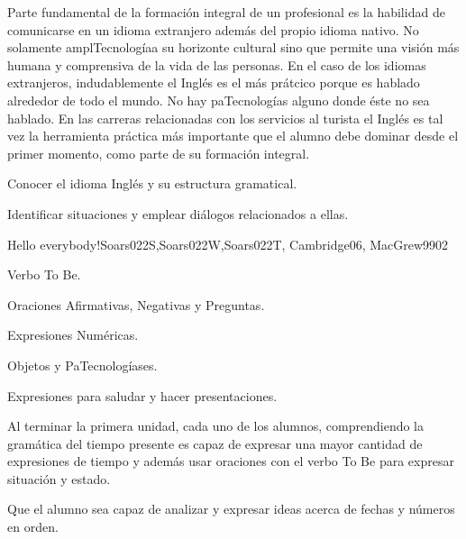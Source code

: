 \begin{syllabus}


\begin{justification}
Parte fundamental de la formación integral de un profesional es la habilidad de comunicarse en un idioma extranjero además del propio idioma nativo. No solamente amplTecnologíaa su horizonte cultural sino que permite una visión más humana y comprensiva de la vida de las personas. En el caso de los idiomas extranjeros, indudablemente el Inglés es el más prátcico porque es hablado alrededor de todo el mundo. No hay paTecnologías alguno donde éste no sea hablado. En las carreras relacionadas con los servicios al turista el Inglés es tal vez la herramienta práctica más importante que el alumno debe dominar desde el primer momento, como parte de su formación integral.
\end{justification}

\begin{goals}
\item Conocer el idioma Inglés y su estructura gramatical.
\item Identificar situaciones y emplear diálogos relacionados a ellas.
\end{goals}

\begin{outcomes}
\end{outcomes}

\begin{unit}{Hello everybody!}{Soars022S,Soars022W,Soars022T, Cambridge06, MacGrew99}{0}{2}
   \begin{topics}
      \item Verbo To Be.
      \item Oraciones Afirmativas, Negativas y Preguntas.
      \item Expresiones Numéricas.
      \item Objetos y PaTecnologíases.
      \item Expresiones para saludar y hacer presentaciones.
   \end{topics}

   \begin{unitgoals}
      \item Al terminar la primera unidad, cada uno de los alumnos, comprendiendo 
            la gramática del tiempo presente es capaz de expresar una mayor cantidad de expresiones de 
            tiempo y además usar oraciones con el verbo To Be para expresar situación y estado. 
      \item Que el alumno sea capaz de analizar y expresar ideas acerca de fechas y números en orden. 
   \end{unitgoals}


\end{unit}
\end{syllabus}

